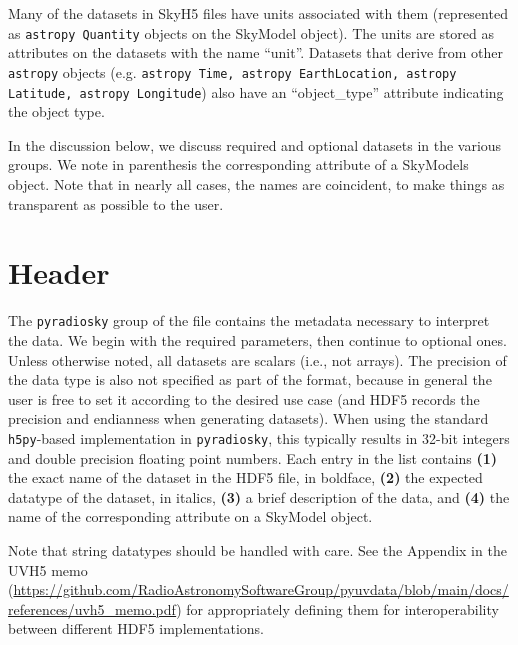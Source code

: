\documentclass[11pt, oneside]{article}
\begin{document}
Many of the datasets in SkyH5 files have units associated with them (represented as \texttt{astropy Quantity} objects on the SkyModel object).
The units are stored as attributes on the datasets with the name ``unit''.
Datasets that derive from other \texttt{astropy} objects (e.g. \texttt{astropy Time,
astropy EarthLocation, astropy Latitude, astropy Longitude})
also have an ``object\_type'' attribute indicating the object type.

In the discussion below, we discuss required and optional datasets in the
various groups. We note in parenthesis the corresponding attribute of a SkyModels
object. Note that in nearly all cases, the names are coincident, to make things
as transparent as possible to the user.

\section{Header}
\label{sec:header}
The \texttt{pyradiosky} group of the file contains the metadata necessary to interpret
the data. We begin with the required parameters, then continue to optional
ones. Unless otherwise noted, all datasets are scalars (i.e., not arrays). The
precision of the data type is also not specified as part of the format, because
in general the user is free to set it according to the desired use case (and
HDF5 records the precision and endianness when generating datasets). When using
the standard \texttt{h5py}-based implementation in \texttt{pyradiosky}, this typically
results in 32-bit integers and double precision floating point numbers. Each
entry in the list contains \textbf{(1)} the exact name of the dataset in the
HDF5 file, in boldface, \textbf{(2)} the expected datatype of the dataset, in
italics, \textbf{(3)} a brief description of the data, and \textbf{(4)} the name
of the corresponding attribute on a SkyModel object.

Note that string datatypes should be handled with care. See
the Appendix in the UVH5 memo (\url{https://github.com/RadioAstronomySoftwareGroup/pyuvdata/blob/main/docs/references/uvh5_memo.pdf})
for appropriately defining them for interoperability between different HDF5 implementations.
\end{document}

